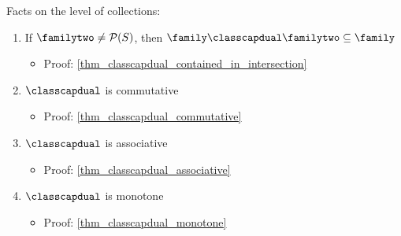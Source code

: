 \vskip0.5cm

Facts on the level of collections:
\begin{enumerate}
    \item {} If $\familytwo \neq \mathcal{P}(S)$, then $\family \classcapdual \familytwo \subseteq \family$
    \begin{itemize}
        \item Proof: \cref{thm_classcapdual_contained_in_intersection}
    \end{itemize}
    
    \item $\classcapdual$ is commutative
    \begin{itemize}
        \item Proof: \cref{thm_classcapdual_commutative}
    \end{itemize}
    
    \item $\classcapdual$ is associative
    \begin{itemize}
        \item Proof: \cref{thm_classcapdual_associative}
    \end{itemize}
    
    \item $\classcapdual$ is monotone
    \begin{itemize}
        \item Proof: \cref{thm_classcapdual_monotone}
    \end{itemize}
\end{enumerate}

\vskip0.5cm


